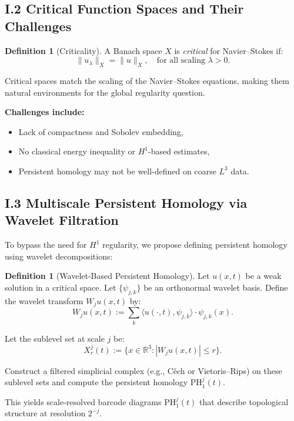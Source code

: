 \documentclass[11pt]{article}
\theoremstyle{definition}
\newtheorem{definition}[theorem]{Definition}
\begin{document}
\subsection*{I.2 Critical Function Spaces and Their Challenges}

\begin{definition}[Criticality]
A Banach space $X$ is \emph{critical} for Navier--Stokes if:
\[ \|u_\lambda\|_X = \|u\|_X, \quad \text{for all scaling } \lambda > 0. \]
\end{definition}

Critical spaces match the scaling of the Navier--Stokes equations, making them natural environments for the global regularity question.

\textbf{Challenges include:}
\begin{itemize}
  \item Lack of compactness and Sobolev embedding,
  \item No classical energy inequality or $H^1$-based estimates,
  \item Persistent homology may not be well-defined on coarse $L^3$ data.
\end{itemize}

\subsection*{I.3 Multiscale Persistent Homology via Wavelet Filtration}

To bypass the need for $H^1$ regularity, we propose defining persistent homology using wavelet decompositions:

\begin{definition}[Wavelet-Based Persistent Homology]
Let $u(x,t)$ be a weak solution in a critical space. Let $\{\psi_{j,k}\}$ be an orthonormal wavelet basis. Define the wavelet transform $W_j u(x,t)$ by:
\[ W_j u(x,t) := \sum_k \langle u(\cdot, t), \psi_{j,k} \rangle \cdot \psi_{j,k}(x). \]

Let the sublevel set at scale $j$ be:
\[ X_r^j(t) := \{x \in \mathbb{R}^3 : |W_j u(x,t)| \leq r\}. \]

Construct a filtered simplicial complex (e.g., C\v{e}ch or Vietoris--Rips) on these sublevel sets and compute the persistent homology $\mathrm{PH}_1^j(t)$.
\end{definition}

This yields scale-resolved barcode diagrams $\mathrm{PH}_1^j(t)$ that describe topological structure at resolution $2^{-j}$.
\end{document}
